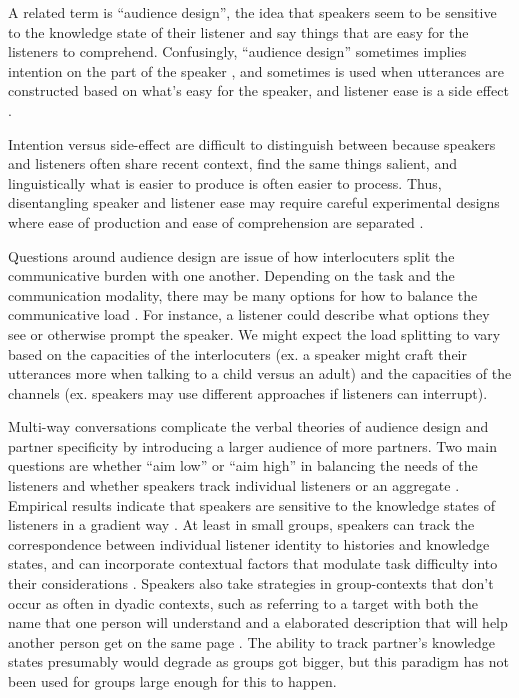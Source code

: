 \documentclass[]{article}
\begin{document}
A related term is ``audience design'', the idea that speakers seem to be sensitive to the knowledge state of their listener and say things that are easy for the listeners to comprehend. Confusingly, ``audience design'' sometimes implies intention on the part of the speaker \citep{horton2002a, horton2005}, and sometimes is used when utterances are constructed based on what's easy for the speaker, and listener ease is a side effect \cite{horton1996, rogers2013, macdonald2013}.

  Intention versus side-effect are difficult to distinguish between because speakers and listeners often share recent context, find the same things salient, and linguistically what is easier to produce is often easier to process. Thus, disentangling speaker and listener ease may require careful experimental designs where ease of production and ease of comprehension are separated \citep{ferreira2004}. 
  
Questions around audience design are issue of how interlocuters split the communicative burden with one another. Depending on the task and the communication modality, there may be many options for how to balance the communicative load  \citep{clark1996, fay2010, foxtree2013}. For instance, a listener could describe what options they see or otherwise prompt the speaker. We might expect the load splitting to vary based on the capacities of the interlocuters (ex. a speaker might craft their utterances more when talking to a child versus an adult) and the capacities of the channels (ex. speakers may use different approaches if listeners can interrupt). 

Multi-way conversations complicate the verbal theories of audience design and partner specificity by introducing a larger audience of more partners. Two main questions are whether ``aim low'' or ``aim high'' in balancing the needs of the listeners and whether speakers track individual listeners or an aggregate \cite{yoon2014}. Empirical results indicate that speakers are sensitive to the knowledge states of listeners in a gradient way \citep{yoon2014, yoon2018, yoon2019}. At least in small groups, speakers can track the correspondence between individual listener identity to histories and knowledge states, and can incorporate contextual factors that modulate task difficulty into their considerations \citep{yoon2019a}. Speakers also take strategies in group-contexts that don't occur as often in dyadic contexts, such as referring to a target with both the name that one person will understand and a elaborated description that will help another person get on the same page \citep{yoon2018}. The ability to track partner's knowledge states presumably would degrade as groups got bigger, but this paradigm has not been used for groups large enough for this to happen. 
\end{document}
